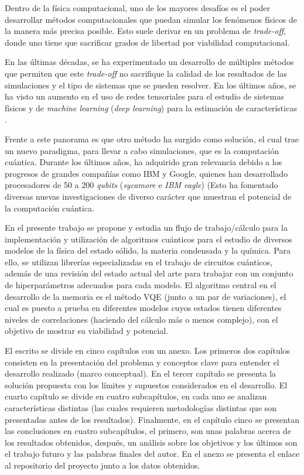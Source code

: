 
Dentro de la física computacional, uno de los mayores desafíos es el poder desarrollar métodos computacionales que puedan simular los fenómenos físicos de la manera más precisa posible. Esto suele derivar en un problema de \textit{trade-off}, donde uno tiene que sacrificar grados de libertad por viabilidad computacional.

En las últimas décadas, se ha experimentado un desarrollo de múltiples métodos que permiten que este \textit{trade-off} no sacrifique la calidad de los resultados de las simulaciones y el tipo de sistemas que se pueden resolver. En los últimos años, se ha visto un aumento en el uso de redes tensoriales \cite{Hauschild_2018} \cite{SCHOLLWOCK201196} para el estudio de sistemas físicos \cite{tensor1} \cite{tensor2} y de \textit{machine learning} (\textit{deep learning}) para la estimación de características \cite{MachineLearning1J}\cite{MachineLearning2}.

Frente a este panorama es que otro método ha surgido como solución, el cual trae un nuevo paradigma, para llevar a cabo simulaciones, que es la computación cuántica. Durante los últimos años, ha adquirido gran relevancia debido a los progresos de grandes compañías como IBM y Google, quienes han desarrollado procesadores de 50 a 200 \textit{qubits} (\textit{sycamore} e \textit{IBM eagle}) \cite{Stanisic2022} \cite{Powers2023}(Esto ha fomentado diversas nuevas investigaciones \cite{Stanisic2022} \cite{Powers2023} de diverso carácter que muestran el potencial de la computación cuántica.

En el presente trabajo se propone y estudia un flujo de trabajo/cálculo para la implementación y utilización de algoritmos cuánticos para el estudio de diversos modelos de la física del estado sólido, la materia condensada y la química. Para ello, se utilizan librerías especializadas en el trabajo de circuitos cuánticos, además de una revisión del estado actual del arte para trabajar con un conjunto de hiperparámetros adecuados para cada modelo. El algoritmo central en el desarrollo de la memoria es el método VQE (junto a un par de variaciones), el cual es puesto a prueba en diferentes modelos cuyos estados tienen diferentes niveles de correlaciones (haciendo del cálculo más o menos complejo), con el objetivo de mostrar su viabilidad y potencial.

El escrito se divide en cinco capítulos con un anexo. Los primeros dos capítulos consisten en la presentación del problema y conceptos clave para entender el desarrollo realizado (marco conceptual). En el tercer capítulo se presenta la solución propuesta con los límites y supuestos considerados en el desarrollo. El cuarto capítulo se divide en cuatro subcapítulos, en cada uno se analizan características distintas (las cuales requieren metodologías distintas que son presentadas antes de los resultados). Finalmente, en el capítulo cinco se presentan las conclusiones en cuatro subcapítulos, el primero, son unas palabras acerca de los resultados obtenidos, después, un análisis sobre los objetivos y los últimos son el trabajo futuro y las palabras finales del autor. En el anexo se presenta el enlace al repositorio del proyecto junto a los datos obtenidos.
